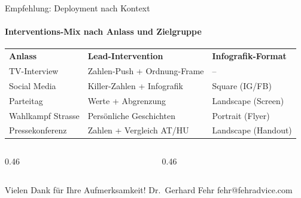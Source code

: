 \documentclass[aspectratio=169, 11pt, xcolor={table}]{beamer}
\begin{document}
\begin{frame}[shrink=5]{Empfehlung: Deployment nach Kontext}
\framesubtitle{Interventions-Mix nach Anlass und Zielgruppe}

\vskip1pt
{\footnotesize
\begin{tabular}{p{2.5cm}p{4.2cm}p{4.2cm}}
    \rowcolor{fadarkblue}
    {\color{fawhite}\bfseries Anlass} &
    {\color{fawhite}\bfseries Lead-Intervention} &
    {\color{fawhite}\bfseries Infografik-Format} \\
    \rowcolor{falightgray}
    TV-Interview & Zahlen-Push + Ordnung-Frame & -- \\
    Social Media & Killer-Zahlen + Infografik & Square (IG/FB) \\
    \rowcolor{falightgray}
    Parteitag & Werte + Abgrenzung & Landscape (Screen) \\
    Wahlkampf Strasse & Pers\"onliche Geschichten & Portrait (Flyer) \\
    \rowcolor{falightgray}
    Pressekonferenz & Zahlen + Vergleich AT/HU & Landscape (Handout) \\
\end{tabular}
}

\vskip4pt

\begin{columns}[T]
    \begin{column}{0.46\textwidth}
    \end{column}
    \begin{column}{0.46\textwidth}
    \end{column}
\end{columns}

\end{frame}


\closingslide
    {Vielen Dank f\"ur \mbox{Ihre} Aufmerksamkeit!}
    {Dr.\ Gerhard Fehr}
    {fehr@fehradvice.com}
\end{document}
